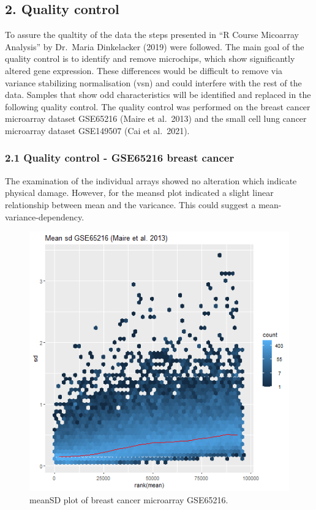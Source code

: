 \documentclass[
]{article}
\begin{document}
\hypertarget{quality-control}{%
\subsection{2. Quality control}\label{quality-control}}

To assure the qualtity of the data the steps presented in ``R Course
Micoarray Analysis'' by Dr.~Maria Dinkelacker (2019) were followed. The
main goal of the quality control is to identify and remove microchips,
which show significantly altered gene expression. These differences
would be difficult to remove via variance stabilizing normalisation
(vsn) and could interfere with the rest of the data. Samples that show
odd characteristics will be identified and replaced in the following
quality control. The quality control was performed on the breast cancer
microarray dataset GSE65216 (Maire et al.~2013) and the small cell lung
cancer microarray dataset GSE149507 (Cai et al.~2021).

\hypertarget{quality-control---gse65216-breast-cancer}{%
\subsubsection{2.1 Quality control - GSE65216 breast
cancer}\label{quality-control---gse65216-breast-cancer}}

The examination of the individual arrays showed no alteration which
indicate physical damage. However, for the meansd plot indicated a
slight linear relationship between mean and the varicance. This could
suggest a mean-variance-dependency.

\begin{figure}

{\centering \includegraphics[width=0.5\linewidth]{images/breast_meansdPlot} 

}

\caption{meanSD plot of breast cancer microarray GSE65216.}\label{fig:unnamed-chunk-1}
\end{figure}
\end{document}

